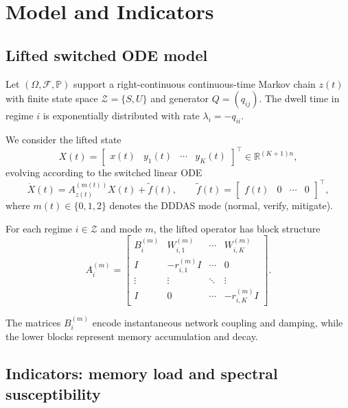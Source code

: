 \documentclass[12pt,a4paper]{article}
\theoremstyle{definition}
\theoremstyle{remark}
\begin{document}
\section{Model and Indicators}

\subsection{Lifted switched ODE model}
\label{subsec:lifted_model}

Let $(\Omega,\mathcal F,\mathbb P)$ support a right-continuous continuous-time
Markov chain $z(t)$ with finite state space $\mathcal Z=\{S,U\}$ and generator
$Q=(q_{ij})$. The dwell time in regime $i$ is exponentially distributed with
rate $\lambda_i=-q_{ii}$.

We consider the lifted state
\[
X(t) = \begin{bmatrix} x(t) & y_1(t) & \cdots & y_K(t) \end{bmatrix}^\top
\in \mathbb R^{(K+1)n},
\]
evolving according to the switched linear ODE
\begin{equation}
	\label{eq:lifted_ode}
	\dot X(t)
	=
	A_{z(t)}^{(m(t))} X(t) + \tilde f(t),
	\qquad
	\tilde f(t) = \begin{bmatrix} f(t) & 0 & \cdots & 0 \end{bmatrix}^\top ,
\end{equation}
where $m(t)\in\{0,1,2\}$ denotes the DDDAS mode (normal, verify, mitigate).

For each regime $i\in\mathcal Z$ and mode $m$, the lifted operator has block
structure
\begin{equation}
	\label{eq:lifted_structure}
	A_i^{(m)}
	=
	\begin{bmatrix}
		B_i^{(m)} & W_{i,1}^{(m)} & \cdots & W_{i,K}^{(m)} \\
		I & -r_{i,1}^{(m)} I & \cdots & 0 \\
		\vdots & \vdots & \ddots & \vdots \\
		I & 0 & \cdots & -r_{i,K}^{(m)} I
	\end{bmatrix}.
\end{equation}

The matrices $B_i^{(m)}$ encode instantaneous network coupling and damping,
while the lower blocks represent memory accumulation and decay.

\subsection{Indicators: memory load and spectral susceptibility}
\label{subsec:indicators}
\end{document}
